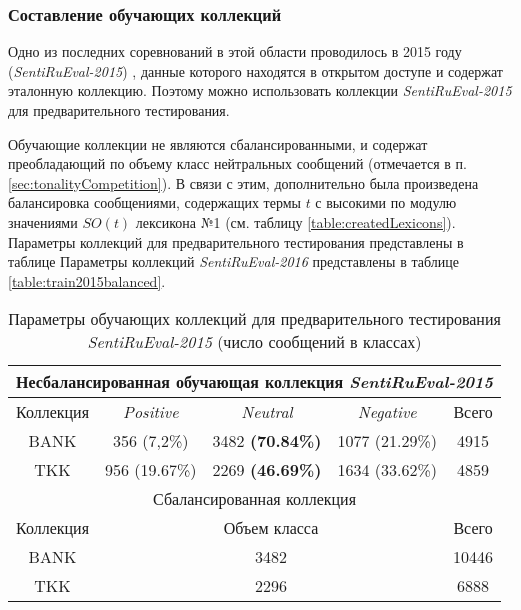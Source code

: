 \subsubsection{Составление обучающих коллекций}

Одно из последних соревнований в этой области проводилось в 2015 году
({\it SentiRuEval-2015}) \cite{dialog2015}, данные которого находятся в открытом
доступе и содержат эталонную коллекцию.
Поэтому можно использовать коллекции {\it SentiRuEval-2015} для предварительного
тестирования.

Обучающие коллекции не являются сбалансированными, и содержат преобладающий
по объему класс нейтральных сообщений (отмечается в п. \ref{sec:tonalityCompetition}).
В связи с этим, дополнительно была произведена балансировка сообщениями,
содержащих термы $t$ с высокими по модулю значениями $SO(t)$ лексикона №1 (см. таблицу \ref{table:createdLexicons}).
Параметры коллекций для предварительного тестирования представлены в таблице
Параметры коллекций {\it SentiRuEval-2016} представлены в таблице \ref{table:train2015balanced}.

\begin{table}[!ht]
\centering
\caption{Параметры обучающих коллекций для предварительного тестирования {\it SentiRuEval-2015} (число сообщений в классах)}
\label{table:train2015}
\begin{tabular}{|c|c|c|c|c|}
\hline
\multicolumn{5}{|c|}{Несбалансированная обучающая коллекция {\it SentiRuEval-2015}}                 \\ \hline
Коллекция & \textit{Positive} & \textit{Neutral} & \textit{Negative} & Всего \\ \hline
BANK      & 356 (7,2\%)       & 3482 {\bf (70.84\%)}   & 1077 (21.29\%)    & 4915  \\ \hline
TKK       & 956 (19.67\%)     & 2269 {\bf (46.69\%)}   & 1634 (33.62\%)    & 4859  \\ \hline
\multicolumn{5}{|c|}{Сбалансированная коллекция}                             \\ \hline
Коллекция & \multicolumn{3}{c|}{Объем класса}                        & Всего \\ \hline
BANK      & \multicolumn{3}{c|}{3482}                                & 10446 \\ \hline
TKK       & \multicolumn{3}{c|}{2296}                                & 6888  \\ \hline
\end{tabular}
\end{table}

